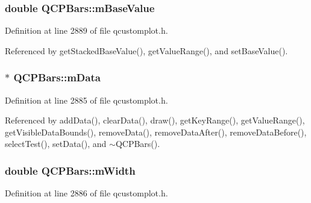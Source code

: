 \hypertarget{class_q_c_p_bars_aa0515cf47fa6044cc28e59b1ae5ec759}{}
\subsubsection[{m\+Base\+Value}]{\setlength{\rightskip}{0pt plus 5cm}double Q\+C\+P\+Bars\+::m\+Base\+Value\hspace{0.3cm}{\ttfamily [protected]}}\label{class_q_c_p_bars_aa0515cf47fa6044cc28e59b1ae5ec759}


Definition at line 2889 of file qcustomplot.\+h.



Referenced by get\+Stacked\+Base\+Value(), get\+Value\+Range(), and set\+Base\+Value().

\hypertarget{class_q_c_p_bars_aef28d29d51ef84b608ecd22c55d531ff}{}
\subsubsection[{m\+Data}]{$\ast$ Q\+C\+P\+Bars\+::m\+Data\hspace{0.3cm}{\ttfamily [protected]}}\label{class_q_c_p_bars_aef28d29d51ef84b608ecd22c55d531ff}


Definition at line 2885 of file qcustomplot.\+h.



Referenced by add\+Data(), clear\+Data(), draw(), get\+Key\+Range(), get\+Value\+Range(), get\+Visible\+Data\+Bounds(), remove\+Data(), remove\+Data\+After(), remove\+Data\+Before(), select\+Test(), set\+Data(), and $\sim$\+Q\+C\+P\+Bars().

\hypertarget{class_q_c_p_bars_a7c4e0f2246f8133f48a9c3f24cf5b920}{}
\subsubsection[{m\+Width}]{\setlength{\rightskip}{0pt plus 5cm}double Q\+C\+P\+Bars\+::m\+Width\hspace{0.3cm}{\ttfamily [protected]}}\label{class_q_c_p_bars_a7c4e0f2246f8133f48a9c3f24cf5b920}


Definition at line 2886 of file qcustomplot.\+h.



